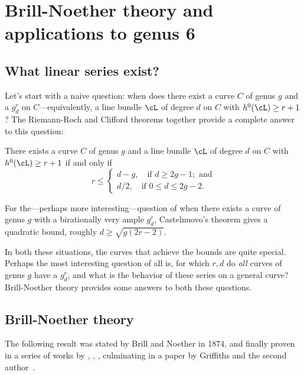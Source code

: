 

\chapter{Brill-Noether theory and applications to genus 6}\label{Brill-Noether}\label{BNChapter}

\section{What linear series exist?}

Let's start with a naive question: when does there exist a curve $C$ of genus $g$ and a $g^r_d$ on $C$---equivalently, a line bundle $\cL$ of degree $d$ on $C$ with $h^0(\cL) \geq r+1$? The Riemann-Roch and Clifford theorems together provide a complete answer to this question:

\begin{theorem}\label{arbitrary linear series}
There exists a curve $C$ of genus $g$ and a line bundle $\cL$ of degree $d$ on $C$ with $h^0(\cL) \geq r+1$ if and only if
$$
r \leq
\begin{cases}
d-g, \quad \text{if } d \geq 2g-1; \text{ and} \\
d/2,  \quad \text{if } 0 \leq d \leq 2g-2.
\end{cases}
$$
\end{theorem}


For the---perhaps more interesting---question of when  there exists a curve of genus $g$ with a birationally very ample $g^r_d$, Castelnuovo's theorem gives a quadratic bound, roughly $d \geq \sqrt{g(2r-2)}$.

In both these situations, the curves that achieve the bounds are quite special. Perhaps the most interesting question of all is, for which $r,d$ do \emph{all} curves of genus $g$ have a $g^r_d$, and what is the
behavior of these series on a general curve? Brill-Noether theory provides some answers to both these questions.

\section{Brill-Noether theory}

The following result was stated by Brill and Noether in 1874, and finally proven in a series of works by
\cite{Kempf}, \cite{MR323792}, \cite{MR0357398}, \cite{Kleiman-special} culminating in a paper by
Griffiths and the second author~\cite{Griffiths-Harris-BN}.

